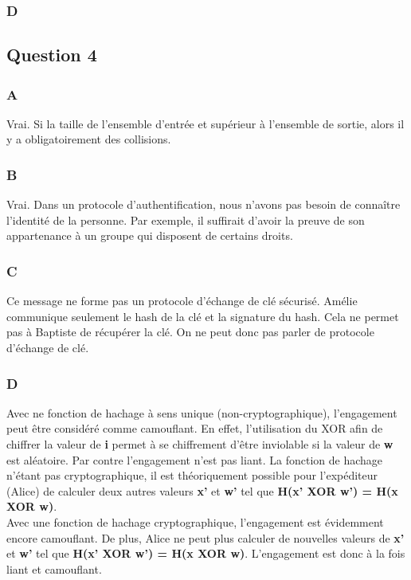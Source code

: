 \documentclass[a4paper, 11pt, oneside]{article}
\begin{document}
\subsubsection{D}



\subsection{Question 4}

\subsubsection{A}

Vrai. Si la taille de l’ensemble d'entrée et supérieur à l'ensemble de sortie, alors il y a obligatoirement des collisions. 

\subsubsection{B}

Vrai. Dans un protocole d’authentification, nous n'avons pas besoin de connaître l'identité de la personne. Par exemple, il suffirait d'avoir la preuve de son appartenance à un groupe qui disposent de certains droits. 

\subsubsection{C}

Ce message ne forme pas un protocole d'échange de clé sécurisé. Amélie communique seulement le hash de la clé et la signature du hash. Cela ne permet pas à Baptiste de récupérer la clé. On ne peut donc pas parler de protocole d'échange de clé.

\subsubsection{D}

Avec ne fonction de hachage à sens unique (non-cryptographique), l'engagement peut être considéré comme camouflant. En effet, l'utilisation du XOR afin de chiffrer la valeur de \textbf{i} permet à se chiffrement d'être inviolable si la valeur de \textbf{w} est aléatoire.
Par contre l'engagement n'est pas liant. La fonction de hachage n'étant pas cryptographique, il est théoriquement possible pour l’expéditeur (Alice) de calculer deux autres valeurs \textbf{x'} et \textbf{w'} tel que \textbf{H(x' XOR w') = H(x XOR w)}. 
\\[5pt]
Avec une fonction de hachage cryptographique, l'engagement est évidemment encore camouflant. De plus, Alice ne peut plus calculer de nouvelles valeurs de \textbf{x'} et \textbf{w'} tel que \textbf{H(x' XOR w') = H(x XOR w)}. L'engagement est donc à la fois liant et camouflant.
\end{document}
